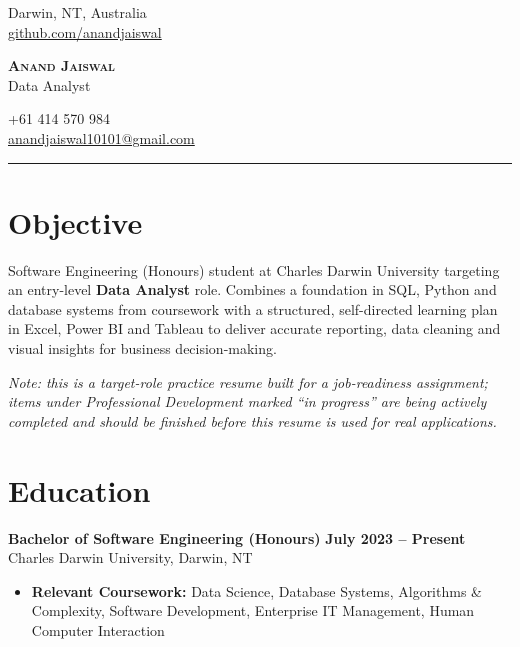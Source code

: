 \documentclass[10.5pt]{article}
\newcommand{\itemlist}[1]{\begin{itemize}[leftmargin=1.4em,itemsep=0pt,topsep=1pt,parsep=0pt]#1\end{itemize}}
\begin{document}
\begin{minipage}[t]{0.33\textwidth}
Darwin, NT, Australia \\
\href{https://github.com/anandjaiswal}{github.com/anandjaiswal}
\end{minipage}
\hfill
\begin{minipage}[t]{0.34\textwidth}
\centering
{\LARGE \scshape \bfseries Anand Jaiswal}\\[2pt]
{\large Data Analyst}
\end{minipage}
\hfill
\begin{minipage}[t]{0.33\textwidth}
\raggedleft
+61 414 570 984 \\
\href{mailto:anandjaiswal10101@gmail.com}{anandjaiswal10101@gmail.com}
\end{minipage}

\vspace{2pt}
\hrule
\vspace{1pt}

\section*{Objective}
Software Engineering (Honours) student at Charles Darwin University targeting an entry-level \textbf{Data Analyst} role. Combines a foundation in SQL, Python and database systems from coursework with a structured, self-directed learning plan in Excel, Power BI and Tableau to deliver accurate reporting, data cleaning and visual insights for business decision-making.

\textit{Note: this is a target-role practice resume built for a job-readiness assignment; items under Professional Development marked ``in progress'' are being actively completed and should be finished before this resume is used for real applications.}

\section{Education}
\textbf{Bachelor of Software Engineering (Honours)} \hfill \textbf{July 2023 -- Present} \\
Charles Darwin University, Darwin, NT
\itemlist{
\item \textbf{Relevant Coursework:} Data Science, Database Systems, Algorithms \& Complexity, Software Development, Enterprise IT Management, Human Computer Interaction
}

\end{document}
